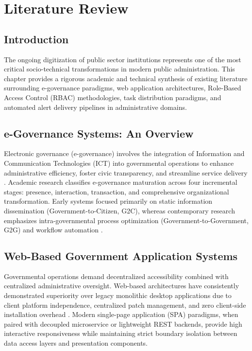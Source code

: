 \chapter{Literature Review}
\label{ch:literature_review}

\section{Introduction}
\label{sec:lit_intro}
The ongoing digitization of public sector institutions represents one of the most critical socio-technical transformations in modern public administration. This chapter provides a rigorous academic and technical synthesis of existing literature surrounding e-governance paradigms, web application architectures, Role-Based Access Control (RBAC) methodologies, task distribution paradigms, and automated alert delivery pipelines in administrative domains.

\section{e-Governance Systems: An Overview}
\label{sec:egov_overview}
Electronic governance (e-governance) involves the integration of Information and Communication Technologies (ICT) into governmental operations to enhance administrative efficiency, foster civic transparency, and streamline service delivery \cite{layne2001developing}. Academic research classifies e-governance maturation across four incremental stages: presence, interaction, transaction, and comprehensive organizational transformation. Early systems focused primarily on static information dissemination (Government-to-Citizen, G2C), whereas contemporary research emphasizes intra-governmental process optimization (Government-to-Government, G2G) and workflow automation \cite{yildiz2007e}.

\section{Web-Based Government Application Systems}
\label{sec:web_gov_systems}
Governmental operations demand decentralized accessibility combined with centralized administrative oversight. Web-based architectures have consistently demonstrated superiority over legacy monolithic desktop applications due to client platform independence, centralized patch management, and zero client-side installation overhead \cite{singh2010web}. Modern single-page application (SPA) paradigms, when paired with decoupled microservice or lightweight REST backends, provide high interactive responsiveness while maintaining strict boundary isolation between data access layers and presentation components.

